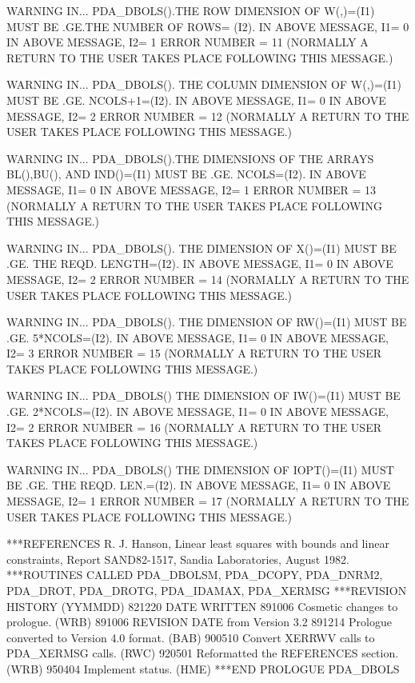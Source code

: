 \documentclass[11pt,twoside,nolof]{starlink}
\begin{document}
\begin{terminalv}
 WARNING IN...
 PDA_DBOLS().THE ROW DIMENSION OF W(,)=(I1) MUST BE .GE.THE NUMBER OF ROWS=
 (I2).
           IN ABOVE MESSAGE, I1=         0
           IN ABOVE MESSAGE, I2=         1
 ERROR NUMBER =        11
 (NORMALLY A RETURN TO THE USER TAKES PLACE FOLLOWING THIS MESSAGE.)

 WARNING IN...
 PDA_DBOLS(). THE COLUMN DIMENSION OF W(,)=(I1) MUST BE .GE. NCOLS+1=(I2).
           IN ABOVE MESSAGE, I1=         0
           IN ABOVE MESSAGE, I2=         2
 ERROR NUMBER =        12
 (NORMALLY A RETURN TO THE USER TAKES PLACE FOLLOWING THIS MESSAGE.)

 WARNING IN...
 PDA_DBOLS().THE DIMENSIONS OF THE ARRAYS BL(),BU(), AND IND()=(I1) MUST BE
 .GE. NCOLS=(I2).
           IN ABOVE MESSAGE, I1=         0
           IN ABOVE MESSAGE, I2=         1
 ERROR NUMBER =        13
 (NORMALLY A RETURN TO THE USER TAKES PLACE FOLLOWING THIS MESSAGE.)

 WARNING IN...
 PDA_DBOLS(). THE DIMENSION OF X()=(I1) MUST BE .GE. THE REQD. LENGTH=(I2).
           IN ABOVE MESSAGE, I1=         0
           IN ABOVE MESSAGE, I2=         2
 ERROR NUMBER =        14
 (NORMALLY A RETURN TO THE USER TAKES PLACE FOLLOWING THIS MESSAGE.)

 WARNING IN...
 PDA_DBOLS(). THE DIMENSION OF RW()=(I1) MUST BE .GE. 5*NCOLS=(I2).
           IN ABOVE MESSAGE, I1=         0
           IN ABOVE MESSAGE, I2=         3
 ERROR NUMBER =        15
 (NORMALLY A RETURN TO THE USER TAKES PLACE FOLLOWING THIS MESSAGE.)

 WARNING IN...
 PDA_DBOLS() THE DIMENSION OF IW()=(I1) MUST BE .GE. 2*NCOLS=(I2).
           IN ABOVE MESSAGE, I1=         0
           IN ABOVE MESSAGE, I2=         2
 ERROR NUMBER =        16
 (NORMALLY A RETURN TO THE USER TAKES PLACE FOLLOWING THIS MESSAGE.)

 WARNING IN...
 PDA_DBOLS() THE DIMENSION OF IOPT()=(I1) MUST BE .GE. THE REQD. LEN.=(I2).
           IN ABOVE MESSAGE, I1=         0
           IN ABOVE MESSAGE, I2=         1
 ERROR NUMBER =        17
 (NORMALLY A RETURN TO THE USER TAKES PLACE FOLLOWING THIS MESSAGE.)

***REFERENCES  R. J. Hanson, Linear least squares with bounds and
                 linear constraints, Report SAND82-1517, Sandia
                 Laboratories, August 1982.
***ROUTINES CALLED  PDA_DBOLSM, PDA_DCOPY, PDA_DNRM2, PDA_DROT, PDA_DROTG,
                    PDA_IDAMAX, PDA_XERMSG
***REVISION HISTORY  (YYMMDD)
   821220  DATE WRITTEN
   891006  Cosmetic changes to prologue.  (WRB)
   891006  REVISION DATE from Version 3.2
   891214  Prologue converted to Version 4.0 format.  (BAB)
   900510  Convert XERRWV calls to PDA_XERMSG calls.  (RWC)
   920501  Reformatted the REFERENCES section.  (WRB)
   950404  Implement status.  (HME)
***END PROLOGUE  PDA_DBOLS
\end{terminalv}
\end{document}
